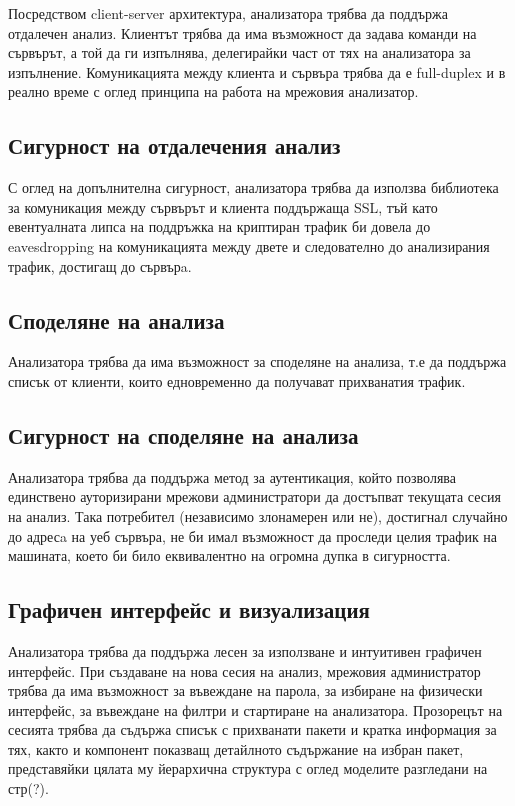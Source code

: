 \documentclass[12pt,a4paper,oneside]{book}
\begin{document}
Посредством client-server архитектура, анализатора трябва да поддържа отдалечен
анализ. Клиентът трябва да има възможност да задава команди на сървърът, а той
да ги изпълнява, делегирайки част от тях на анализатора за изпълнение.
Комуникацията между клиента и сървъра трябва да е full-duplex и в реално време с
оглед принципа на работа на мрежовия анализатор.

\subsection{Сигурност на отдалечения анализ}

С оглед на допълнителна сигурност, анализатора трябва да използва библиотека за
комуникация между сървърът и клиента поддържаща SSL, тъй като евентуалната липса
на поддръжка на криптиран трафик би довела до eavesdropping на комуникацията
между двете и следователно до анализирания трафик, достигащ до сървърa.

\subsection{Споделяне на анализа}

Анализатора трябва да има възможност за споделяне на анализа, т.е да поддържа
списък от клиенти, които едновременно да получават прихванатия трафик. 

\subsection{Сигурност на споделяне на анализа}

Анализатора трябва да поддържа метод за аутентикация, който позволява единствено
ауторизирани мрежови администратори да достъпват текущата сесия на
анализ. Така потребител (независимо злонамерен или не), достигнал случайно до
адресa на уеб сървъра, не би имал възможност да проследи целия трафик на
машината, което би било еквивалентно на огромна дупка в сигурността.

\subsection{Графичен интерфейс и визуализация}

Анализатора трябва да поддържа лесен за използване и интуитивен графичен
интерфейс. При създаване на нова сесия на анализ, мрежовия администратор трябва
да има възможност за въвеждане на парола, за избиране на физически интерфейс, за
въвеждане на филтри и стартиране на анализатора. Прозорецът на сесията трябва да
съдържа списък с прихванати пакети и кратка информация за тях, както и
компонент показващ детайлното съдържание на избран пакет, представяйки цялата му
йерархична структура с оглед моделите разгледани на стр(?).
\end{document}
